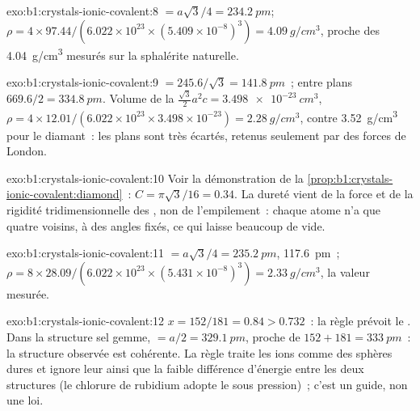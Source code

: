 \begin{solution}{exo:b1:crystals-ionic-covalent:8}
 $= a\sqrt3/4 = \qty{234.2}{pm}$;
$\rho = 4 \times 97.44/(6.022 \times 10^{23} \times (5.409 \times
10^{-8})^3) = \qty{4.09}{g/cm^3}$, proche des \qty{4.04}{g/cm^3}
mesurés sur la sphalérite naturelle.
\end{solution}

\begin{solution}{exo:b1:crystals-ionic-covalent:9}
 $= 245.6/\sqrt3 = \qty{141.8}{pm}$~; entre plans $669.6/2 =
\qty{334.8}{pm}$. Volume de la  $\frac{\sqrt3}{2}a^2c = \qty{3.498e-23}{cm^3}$,
$\rho = 4 \times 12.01/(6.022 \times 10^{23} \times 3.498 \times 10^{-23})
= \qty{2.28}{g/cm^3}$, contre \qty{3.52}{g/cm^3} pour le diamant~: les
plans sont très écartés, retenus seulement par des forces de London.
\end{solution}

\begin{solution}{exo:b1:crystals-ionic-covalent:10}
Voir la démonstration de la \cref{prop:b1:crystals-ionic-covalent:diamond}~:
$C = \pi\sqrt3/16 = 0.34$. La dureté vient de la force et de la rigidité
tridimensionnelle des , non de l'empilement~: chaque
atome n'a que quatre voisins, à des angles fixés, ce qui laisse beaucoup
de vide.
\end{solution}

\begin{solution}{exo:b1:crystals-ionic-covalent:11}
 $= a\sqrt3/4 = \qty{235.2}{pm}$, 
\qty{117.6}{pm}~; $\rho = 8 \times 28.09/(6.022 \times 10^{23} \times
(5.431 \times 10^{-8})^3) = \qty{2.33}{g/cm^3}$, la valeur mesurée.
\end{solution}

\begin{solution}{exo:b1:crystals-ionic-covalent:12}
$x = 152/181 = 0.84 > 0.732$~: la règle prévoit le . Dans la structure sel gemme,  $= a/2 = \qty{329.1}{pm}$,
proche de $152 + 181 = \qty{333}{pm}$~: la structure observée est
cohérente. La règle traite les ions comme des sphères dures et ignore
leur  ainsi que la faible différence d'énergie entre les
deux structures (le chlorure de rubidium adopte le  sous pression)~; c'est un guide, non une loi.
\end{solution}

